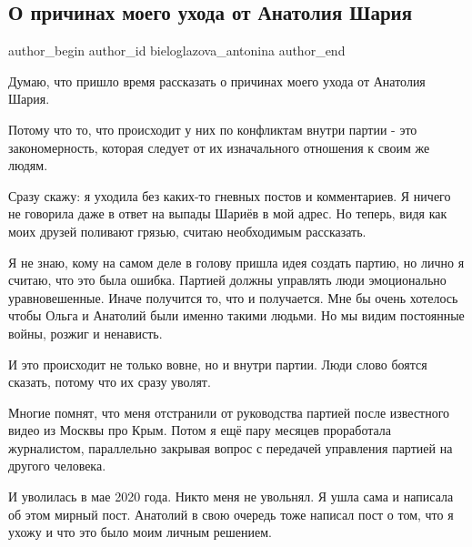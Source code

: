  
 
 
 
 
 
\subsection{О причинах моего ухода от Анатолия Шария}
\label{sec:18_08_2021.fb.bieloglazova_antonina.1.uhod_sharij_prichiny}
 
\ifcmt
 author_begin
   author_id bieloglazova_antonina
 author_end
\fi

Думаю, что пришло время рассказать о причинах моего ухода от Анатолия Шария. 

Потому что то, что происходит у них по конфликтам внутри партии - это
закономерность, которая следует от их изначального отношения к своим же людям. 

Сразу скажу: я уходила без каких-то гневных постов и комментариев. Я ничего не
говорила даже в ответ на выпады Шариёв в мой адрес. Но теперь, видя как моих
друзей поливают грязью, считаю необходимым рассказать. 

Я не знаю, кому на самом деле в голову пришла идея создать партию, но лично я
считаю, что это была ошибка. Партией должны управлять люди эмоционально
уравновешенные. Иначе получится то, что и получается. Мне бы очень хотелось
чтобы Ольга и Анатолий были именно такими людьми. Но мы видим постоянные войны,
розжиг и ненависть. 

И это происходит не только вовне, но и внутри партии. Люди слово боятся
сказать, потому что их сразу уволят. 

Многие помнят, что меня отстранили от руководства партией после известного
видео из Москвы про Крым. Потом я ещё пару месяцев проработала журналистом,
параллельно закрывая вопрос с передачей управления партией на другого человека. 

И уволилась в мае 2020 года. Никто меня не увольнял. Я ушла сама и написала об
этом мирный пост. Анатолий в свою очередь тоже написал пост о том, что я ухожу
и что это было моим личным решением. 

